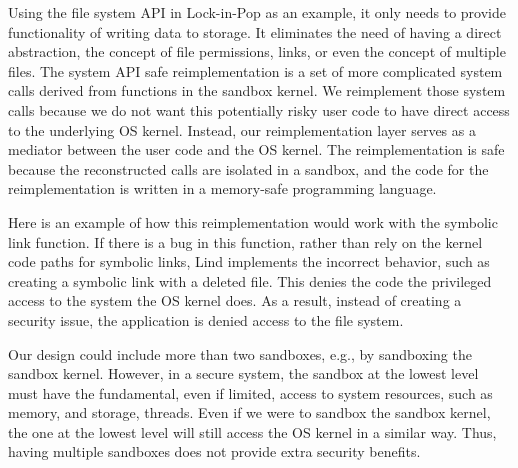Using the file system API in Lock-in-Pop as an example, it only needs
to provide functionality of writing data to storage. 
It eliminates the need of having a direct abstraction, the
concept of file permissions, links, or even the concept of multiple files.
The system API safe reimplementation is a set of more complicated system calls
derived from functions in the sandbox kernel.
We reimplement those system calls because we do not want this potentially risky user code
to have direct access to the underlying OS kernel.
Instead, our reimplementation layer serves as a mediator between the user code
and the OS kernel. The reimplementation is safe
because the reconstructed calls are isolated in a sandbox, and the code for the
reimplementation is written in a memory-safe programming language.

Here is an example of how this reimplementation would work with the symbolic link function.
If there is a bug in this function, rather than rely on the kernel code paths
for symbolic links, Lind implements the incorrect behavior, such as creating a symbolic link 
with a deleted file. 
This denies the code the privileged access to the system the OS kernel does.
As a result, instead of creating a security issue, the application is denied access
to the file system.

Our design could include more than two sandboxes, e.g., by sandboxing the sandbox
kernel. However, in a secure system,
the sandbox at the lowest level must have the fundamental,
even if limited, access to system resources, such as memory, and storage, threads.
Even if we were to sandbox the sandbox kernel, 
the one at the lowest level will still access the OS kernel in a similar way.
Thus, having multiple sandboxes does not provide extra security benefits.